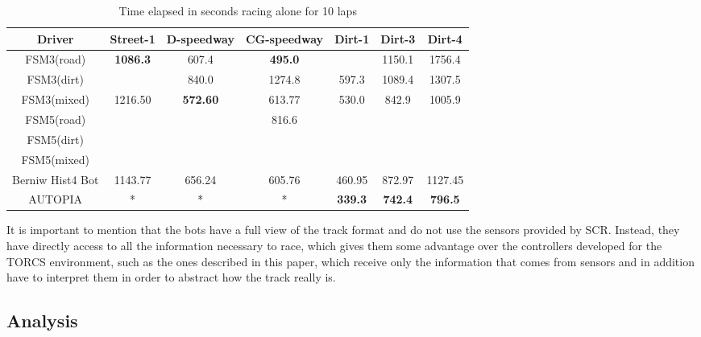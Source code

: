 	
	\begin{table*}[t]
	\renewcommand{\arraystretch}{1.3}
	\caption{Time elapsed in seconds racing alone for 10 laps}
	\label{tbl:time raced}
	\centering
	\begin{tabular}{c||c||c||c||c||c||c}
	\hline
	\bfseries Driver & \bfseries Street-1 & \bfseries D-speedway & \bfseries CG-speedway & \bfseries Dirt-1 & \bfseries Dirt-3 & \bfseries Dirt-4 \\ 
	\hline
		\hline FSM3(road) & \textbf{1086.3} & 607.4 & \textbf{495.0} & \textdagger & 1150.1 & 1756.4 \\
	\hline FSM3(dirt) & \textdagger & 840.0 & 1274.8 & 597.3 & 1089.4 & 1307.5 \\
	\hline FSM3(mixed) & 1216.50 & \textbf{572.60} & 613.77& 530.0 & 842.9 & 1005.9 \\
	\hline FSM5(road) & \textdagger & \textdagger & 816.6 & \textdagger & \textdagger & \textdagger \\
	\hline FSM5(dirt) & \textdagger & \textdagger & \textdagger & \textdagger &	\textdagger & \textdagger \\
	\hline FSM5(mixed) & \textdagger & \textdagger & \textdagger & \textdagger & \textdagger & \textdagger \\
	\hline Berniw Hist4 Bot & 1143.77 & 656.24 & 605.76 & 460.95 & 872.97 & 1127.45 \\
	\hline AUTOPIA & * & * & * & \textbf{339.3} & \textbf{742.4} & \textbf{796.5} \\
	\hline 
	\end{tabular} 
	\end{table*}
	
	It is important to mention that the bots have a full view of the track format and do not use the sensors provided by SCR. Instead, they have directly access to all the information necessary to race, which gives them some advantage over the controllers developed for the TORCS environment, such as the ones described in this paper, which receive only the information that comes from sensors and in addition have to interpret them in order to abstract how the track really is. 
	
\subsection{Analysis} \label{subsec:Analysis}
	
